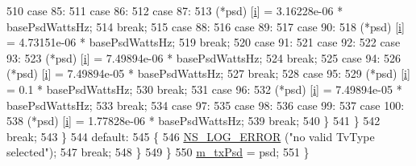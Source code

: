 \begin{DoxyCode}
510                   \textcolor{keywordflow}{case} 85:
511                   \textcolor{keywordflow}{case} 86:
512                   \textcolor{keywordflow}{case} 87:
513                     (*psd) [\hyperlink{bernuolliDistribution_8m_a6f6ccfcf58b31cb6412107d9d5281426}{i}] = 3.16228e-06 * basePsdWattsHz;
514                     \textcolor{keywordflow}{break};
515                   \textcolor{keywordflow}{case} 88:
516                   \textcolor{keywordflow}{case} 89:
517                   \textcolor{keywordflow}{case} 90:
518                     (*psd) [\hyperlink{bernuolliDistribution_8m_a6f6ccfcf58b31cb6412107d9d5281426}{i}] = 4.73151e-06 * basePsdWattsHz;
519                     \textcolor{keywordflow}{break};
520                   \textcolor{keywordflow}{case} 91:
521                   \textcolor{keywordflow}{case} 92:
522                   \textcolor{keywordflow}{case} 93:
523                     (*psd) [\hyperlink{bernuolliDistribution_8m_a6f6ccfcf58b31cb6412107d9d5281426}{i}] = 7.49894e-06 * basePsdWattsHz;
524                     \textcolor{keywordflow}{break};
525                   \textcolor{keywordflow}{case} 94:
526                     (*psd) [\hyperlink{bernuolliDistribution_8m_a6f6ccfcf58b31cb6412107d9d5281426}{i}] = 7.49894e-05 * basePsdWattsHz;
527                     \textcolor{keywordflow}{break};
528                   \textcolor{keywordflow}{case} 95:
529                     (*psd) [\hyperlink{bernuolliDistribution_8m_a6f6ccfcf58b31cb6412107d9d5281426}{i}] = 0.1 * basePsdWattsHz;
530                     \textcolor{keywordflow}{break};
531                   \textcolor{keywordflow}{case} 96:
532                     (*psd) [\hyperlink{bernuolliDistribution_8m_a6f6ccfcf58b31cb6412107d9d5281426}{i}] = 7.49894e-05 * basePsdWattsHz;
533                     \textcolor{keywordflow}{break};
534                   \textcolor{keywordflow}{case} 97:
535                   \textcolor{keywordflow}{case} 98:
536                   \textcolor{keywordflow}{case} 99:
537                   \textcolor{keywordflow}{case} 100:
538                     (*psd) [\hyperlink{bernuolliDistribution_8m_a6f6ccfcf58b31cb6412107d9d5281426}{i}] = 1.77828e-06 * basePsdWattsHz;
539                     \textcolor{keywordflow}{break};
540                 \}
541             \}
542           \textcolor{keywordflow}{break};
543         \}
544       \textcolor{keywordflow}{default}:
545         \{
546           \hyperlink{group__logging_ga0261a8db1d4ac5f79417d117634fd455}{NS\_LOG\_ERROR} (\textcolor{stringliteral}{"no valid TvType selected"});
547           \textcolor{keywordflow}{break};
548         \}
549     \}
550   \hyperlink{classns3_1_1TvSpectrumTransmitter_add26555fe4d51eb5d9a757a54dc36dd0}{m\_txPsd} = psd;
551 \}
\end{DoxyCode}


